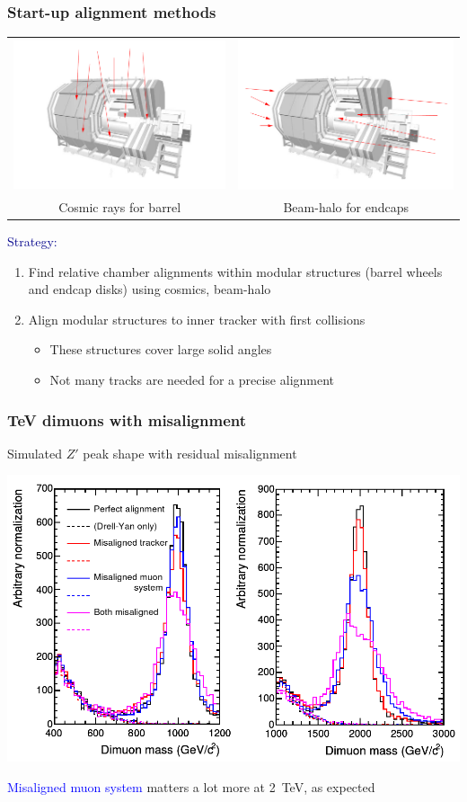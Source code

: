 \documentclass[compress]{beamer}
\begin{document}
\begin{frame}
\frametitle{Start-up alignment methods}

\begin{tabular}{c c}
\includegraphics[height=3.5 cm]{cosmics.pdf} & \includegraphics[height=3.5 cm]{beamhalo.pdf} \\
Cosmic rays for barrel & Beam-halo for endcaps
\end{tabular}

\vfill \vfill \textcolor{darkblue}{Strategy:}
\begin{enumerate}
\item Find relative chamber alignments within modular structures (barrel wheels and endcap disks) using cosmics, beam-halo
\item Align modular structures to inner tracker with first collisions
\begin{itemize}
\item These structures cover large solid angles
\item Not many tracks are needed for a precise alignment
\end{itemize}
\end{enumerate}
\end{frame}

\begin{frame}
\frametitle{TeV dimuons with misalignment}

Simulated $Z'$ peak shape with residual misalignment

\vfill \includegraphics[width=\linewidth]{misaligned_spectra.png}

\textcolor{blue}{Misaligned muon system} matters a lot more at 2~TeV, as expected
\end{frame}
\end{document}
